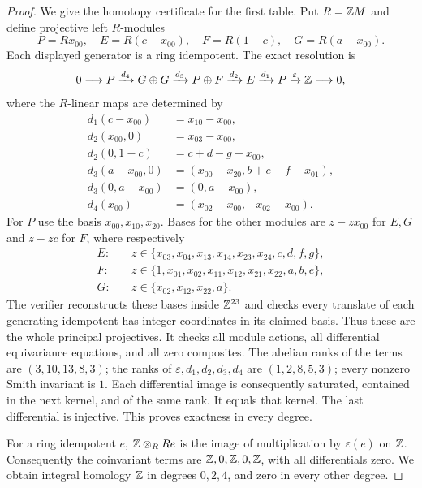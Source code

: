 \begin{proof}
We give the homotopy certificate for the first table. Put $R=\mathbb{Z} M$ and
define projective left $R$-modules
\[
 P=Rx_{00},\quad E=R(c-x_{00}),\quad F=R(1-c),\quad G=R(a-x_{00}).
\]
Each displayed generator is a ring idempotent. The exact resolution is
\[
0\longrightarrow P\xrightarrow{d_4}G\oplus G
 \xrightarrow{d_3}P\oplus F\xrightarrow{d_2}E
 \xrightarrow{d_1}P\xrightarrow{\varepsilon}\mathbb{Z}\longrightarrow0,
\]
where the $R$-linear maps are determined by
\begin{align*}
d_1(c-x_{00})&=x_{10}-x_{00},\\
d_2(x_{00},0)&=x_{03}-x_{00},\\
d_2(0,1-c)&=c+d-g-x_{00},\\
d_3(a-x_{00},0)&=(x_{00}-x_{20},b+e-f-x_{01}),\\
d_3(0,a-x_{00})&=(0,a-x_{00}),\\
d_4(x_{00})&=(x_{02}-x_{00},-x_{02}+x_{00}).
\end{align*}
For $P$ use the basis $x_{00},x_{10},x_{20}$. Bases for the other modules
are $z-zx_{00}$ for $E,G$ and $z-zc$ for $F$, where respectively
\begin{align*}
E:\quad&z\in\{x_{03},x_{04},x_{13},x_{14},x_{23},x_{24},c,d,f,g\},\\
F:\quad&z\in\{1,x_{01},x_{02},x_{11},x_{12},x_{21},x_{22},a,b,e\},\\
G:\quad&z\in\{x_{02},x_{12},x_{22},a\}.
\end{align*}
The verifier reconstructs these bases inside $\mathbb{Z}^{23}$ and checks every
translate of each generating idempotent has integer coordinates in its
claimed basis. Thus these are the whole principal projectives. It checks
all module actions, all differential equivariance equations, and all zero
composites. The abelian ranks of the terms are $(3,10,13,8,3)$; the ranks
of $\varepsilon,d_1,d_2,d_3,d_4$ are $(1,2,8,5,3)$; every nonzero Smith
invariant is $1$. Each differential image is consequently saturated,
contained in the next kernel, and of the same rank. It equals that kernel.
The last differential is injective. This proves exactness in every degree.

For a ring idempotent $e$, $\mathbb{Z}\otimes_R Re$ is the image of multiplication
by $\varepsilon(e)$ on $\mathbb{Z}$. Consequently the coinvariant terms are
$\mathbb{Z},0,\mathbb{Z},0,\mathbb{Z}$, with all differentials zero. We obtain integral homology
$\mathbb{Z}$ in degrees $0,2,4$, and zero in every other degree.


\end{proof}
